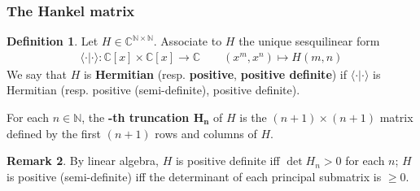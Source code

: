 \documentclass[12pt,b5paper,notitlepage]{article}
\theoremstyle{definition}
\newtheorem{df}{Definition}[subsection]
\newtheorem{rem}[df]{Remark}
\theoremstyle{plain}
\newcommand{\bk}[1]{\langle {#1}\rangle}
\newcommand{\Cbb}{\mathbb C}
\newcommand{\Nbb}{\mathbb N}
\numberwithin{equation}{section}
\begin{document}
\subsubsection{The Hankel matrix}


\begin{df}
Let $H\in\Cbb^{\Nbb\times\Nbb}$. Associate to $H$ the unique sesquilinear form
\begin{align*}
\bk{\cdot|\cdot}:\Cbb[x]\times\Cbb[x]\rightarrow\Cbb\qquad (x^m,x^n)\mapsto H(m,n)
\end{align*} 
We say that $H$ is \textbf{Hermitian} (resp. \textbf{positive}, \textbf{positive definite}) if $\bk{\cdot|\cdot}$ is Hermitian (resp. positive (semi-definite), positive definite). 

For each $n\in\Nbb$, the \textbf{-th truncation $\pmb{H_n}$} of $H$ is the $(n+1)\times(n+1)$ matrix defined by the first $(n+1)$ rows and columns of $H$. \hfill
\end{df}


\begin{rem}
By linear algebra, $H$ is positive definite iff $\det H_n>0$ for each $n$; $H$ is positive (semi-definite) iff the determinant of each principal submatrix is $\geq0$.
\end{rem}
\end{document}
